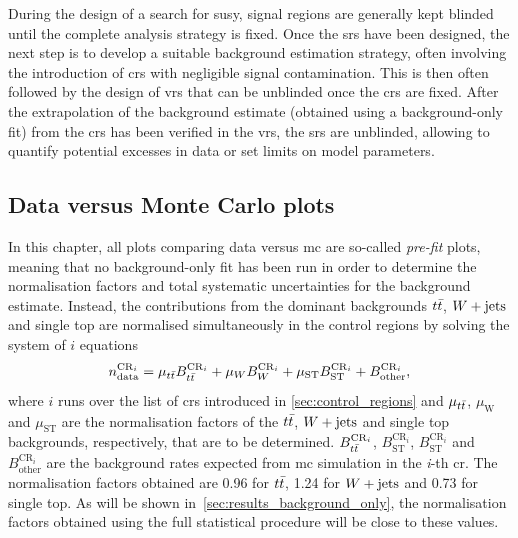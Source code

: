 During the design of a search for \gls{susy}, signal regions are generally kept blinded until the complete analysis strategy is fixed.
Once the \glspl{sr} have been designed, the next step is to develop a suitable background estimation strategy, often involving the introduction of \glspl{cr} with negligible signal contamination.
This is then often followed by the design of \glspl{vr} that can be unblinded once the \glspl{cr} are fixed.
After the extrapolation of the background estimate (obtained using a background-only fit) from the \glspl{cr} has been verified in the \glspl{vr}, the \glspl{sr} are unblinded, allowing to quantify potential excesses in data or set limits on model parameters.

\subsection{Data versus Monte Carlo plots}

In this chapter, all plots comparing data versus \gls{mc} are so-called \textit{pre-fit} plots, meaning that no background-only fit has been run in order to determine the normalisation factors and total systematic uncertainties for the background estimate.
Instead, the contributions from the dominant backgrounds $t\bar{t}$, $W+\mathrm{jets}$ and single top are normalised simultaneously in the control regions by solving the system of $i$ equations
\begin{equation}
		n_\mathrm{data}^{\mathrm{CR}_i} = \mu_{t\bar{t}} B_{t\bar{t}}^{\mathrm{CR}_i} + \mu_{W} B_{W}^{\mathrm{CR}_i} + \mu_\mathrm{ST} B_\mathrm{ST}^{\mathrm{CR}_i} + B_\mathrm{other}^{\mathrm{CR}_i},
\end{equation}
where $i$ runs over the list of \glspl{cr} introduced in \cref{sec:control_regions} and $\mu_{t\bar{t}}$, $\mu_\mathrm{W}$ and $\mu_\mathrm{ST}$ are the normalisation factors of the $t\bar{t}$, $W+\mathrm{jets}$ and single top backgrounds, respectively, that are to be determined.
$B_{t\bar{t}}^{\mathrm{CR}_i}$, $B_\mathrm{ST}^{\mathrm{CR}_i}$, $B_\mathrm{ST}^{\mathrm{CR}_i}$ and $B_\mathrm{other}^{\mathrm{CR}_i}$ are the background rates expected from \gls{mc} simulation in the \textit{i}-th \gls{cr}.
The normalisation factors obtained are 0.96 for $t\bar{t}$, 1.24 for $W+\mathrm{jets}$ and 0.73 for single top. As will be shown in~\cref{sec:results_background_only}, the normalisation factors obtained using the full statistical procedure will be close to these values.

